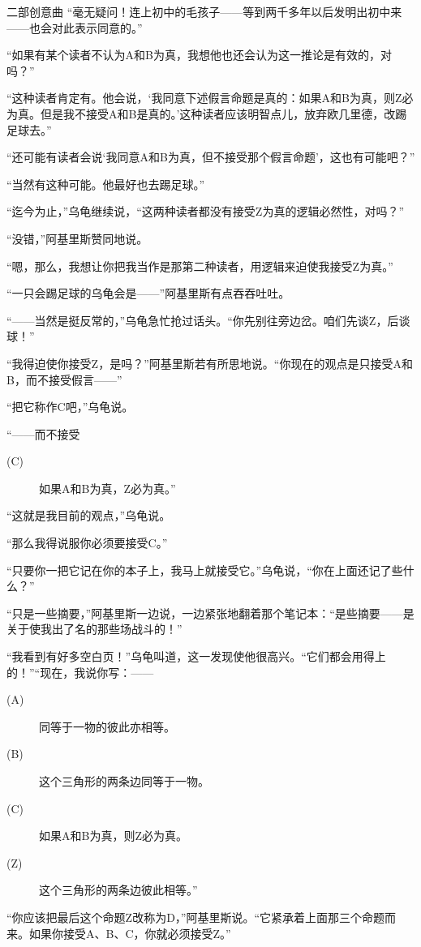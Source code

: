\begin{dialog}{二部创意曲}
“毫无疑问！连上初中的毛孩子——等到两千多年以后发明出初中来——也会对此表示同意的。”

“如果有某个读者不认为A和B为真，我想他也还会认为这一推论是有效的，对吗？”

“这种读者肯定有。他会说，‘我同意下述假言命题是真的：如果A和B为真，则Z必为真。但是我不接受A和B是真的。’这种读者应该明智点儿，放弃欧几里德，改踢足球去。”

“还可能有读者会说‘我同意A和B为真，但不接受那个假言命题’，这也有可能吧？”

“当然有这种可能。他最好也去踢足球。”

“迄今为止，”乌龟继续说，“这两种读者都没有接受Z为真的逻辑必然性，对吗？”

“没错，”阿基里斯赞同地说。

“嗯，那么，我想让你把我当作是那第二种读者，用逻辑来迫使我接受Z为真。”

“一只会踢足球的乌龟会是——”阿基里斯有点吞吞吐吐。

“——当然是挺反常的，”乌龟急忙抢过话头。“你先别往旁边岔。咱们先谈Z，后谈球！”

“我得迫使你接受Z，是吗？”阿基里斯若有所思地说。“你现在的观点是只接受A和B，而不接受假言——”

“把它称作C吧，”乌龟说。

“——而不接受
\begin{description}
\item[(C)] 如果A和B为真，Z必为真。”
\end{description}

“这就是我目前的观点，”乌龟说。

“那么我得说服你必须要接受C。”

“只要你一把它记在你的本子上，我马上就接受它。”乌龟说，“你在上面还记了些什么？”

“只是一些摘要，”阿基里斯一边说，一边紧张地翻着那个笔记本：“是些摘要——是关于使我出了名的那些场战斗的！”

“我看到有好多空白页！”乌龟叫道，这一发现使他很高兴。“它们都会用得上的！”“现在，我说你写：——
\begin{description}
\item[(A)] 同等于一物的彼此亦相等。
\item[(B)] 这个三角形的两条边同等于一物。
\item[(C)] 如果A和B为真，则Z必为真。
\item[(Z)] 这个三角形的两条边彼此相等。”
\end{description}

“你应该把最后这个命题Z改称为D，”阿基里斯说。“它紧承着上面那三个命题而来。如果你接受A、B、C，你就必须接受Z。”


\end{dialog}
